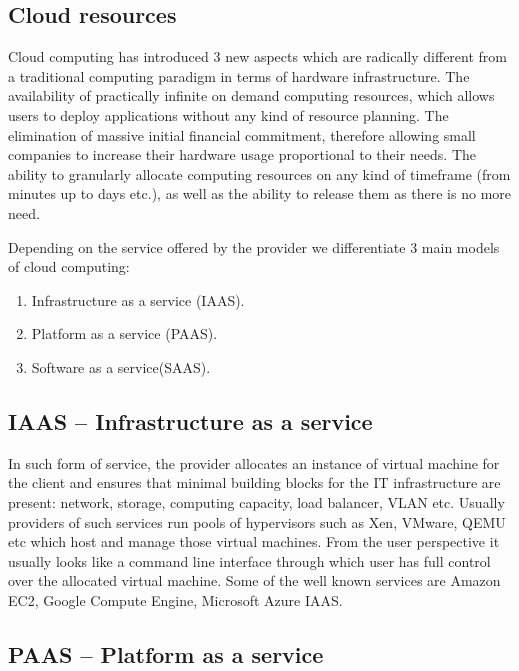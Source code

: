 \documentclass[licencjacka,en]{thesisclass}
\begin{document}
        \subsection{Cloud resources}

        Cloud computing has introduced 3 new aspects which are radically different from a traditional
        computing paradigm in terms of hardware infrastructure. 
        The availability of practically infinite on demand computing resources,
        which allows users to deploy applications without any kind of resource planning.  
        The elimination of massive initial financial commitment, therefore allowing small companies to increase
        their hardware usage proportional to their needs.
        The ability to granularly allocate computing resources on any kind of timeframe
        (from minutes up to days etc.), as well as the ability to release them as there is no more need.

        Depending on the service offered by the provider we differentiate 3 main models of cloud computing:

        \begin{enumerate}
            \item Infrastructure as a service (IAAS).
            \item Platform as a service (PAAS).
            \item Software as a service(SAAS).
        \end{enumerate}

        \subsection{IAAS -- Infrastructure as a service}

        In such form of service, the provider allocates an instance of virtual machine for the client 
        and ensures that minimal building blocks for the IT infrastructure are present:
        network, storage, computing capacity, load balancer, VLAN etc.
        Usually providers of such services run pools of hypervisors such as Xen, VMware, QEMU etc which host and manage
        those virtual machines. From the user perspective it usually looks like a command line interface
        through which user has full control over the allocated virtual machine. Some of the well known
        services are Amazon EC2, Google Compute Engine, Microsoft Azure IAAS.

        \subsection{PAAS -- Platform as a service}
\end{document}
